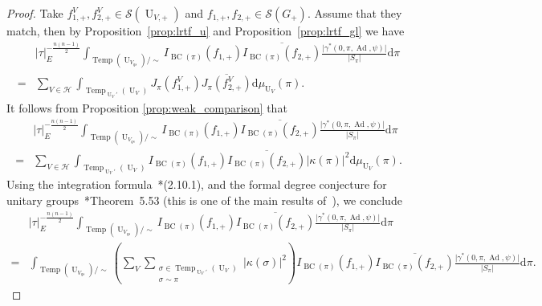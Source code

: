 \documentclass[letterpaper,11pt]{amsart}
\newcommand{\cH}{\mathcal{H}}
\newcommand{\cS}{\mathcal{S}}
\newcommand{\rd}{\mathrm{d}}
\newcommand{\<}{\negthickspace}
\providecommand{\abs}[1]{\lvert#1\rvert}
\DeclareMathOperator{\U}{U}
\DeclareMathOperator{\BC}{BC}
\DeclareMathOperator{\Ad}{Ad}
\DeclareMathOperator{\Temp}{Temp} \DeclareMathOperator{\temp}{temp}
\theoremstyle{definition}
\theoremstyle{plain}
\theoremstyle{remark}
\numberwithin{equation}{section}
\begin{document}
\begin{proof}
Take $f^V_{1, +}, f^V_{2, +} \in \cS(\U_{V, +})$ and $f_{1, +}, f_{2, +} \in
\cS(G_+)$. Assume that they match, then by Proposition~\ref{prop:lrtf_u} and
Proposition~\ref{prop:lrtf_gl} we have
    \[
    \begin{aligned}
    &\abs{\tau}_E^{-\frac{n(n-1)}{2}}
    \int_{\Temp(\U_{V_{qs}})/\sim} I_{\BC(\pi)}(f_{1, +})
    \overline{I_{\BC(\pi)}(f_{2, +})}
    \frac{\abs{\gamma^*(0,\pi, \Ad, \psi)}}{\abs{S_{\pi}}} \rd \pi\\
     =
    & \sum_{V \in \cH} \int_{\Temp_{\U_V'}(\U_V)} J_{\pi}(f_{1, +}^V)
    \overline{J_{\pi}(f_{2, +}^V)}
    \rd \mu_{\U_V}(\pi).
    \end{aligned}
    \]
It follows from Proposition \ref{prop:weak_comparison}
that
    \[
    \begin{aligned}
    &\abs{\tau}_E^{-\frac{n(n-1)}{2}}
    \int_{\Temp(\U_{V_{qs}})/\sim} I_{\BC(\pi)}(f_{1, +}) \overline{I_{\BC(\pi)}(f_{2, +})}
    \frac{\abs{\gamma^*(0,\pi, \Ad, \psi)}}{\abs{S_{\pi}}} \rd \pi\\
     =
    & \sum_{V \in \cH} \int_{\Temp_{\U_V'}(\U_V)}
    I_{\BC(\pi)}(f_{1, +}) \overline{I_{\BC(\pi)}(f_{2, +})}
    \abs{\kappa(\pi)}^2
    \rd \mu_{\U_V}(\pi).
    \end{aligned}
    \]
Using the integration formula~\cite{BP1}*{(2.10.1)}, and the formal degree
conjecture for unitary groups~\cite{BP1}*{Theorem~5.53} (this is one of the
main results of~\cite{BP1}), we conclude
    \begin{equation}    \label{eq:lrtf_comparison}
    \begin{aligned}
    &\abs{\tau}_E^{-\frac{n(n-1)}{2}}
    \int_{\Temp(\U_{V_{qs}})/\sim} I_{\BC(\pi)}(f_{1, +})
    \overline{I_{\BC(\pi)}(f_{2, +})}
    \frac{\abs{\gamma^*(0,\pi, \Ad, \psi)}}{\abs{S_{\pi}}} \rd \pi\\
     =
    & \int_{\Temp(\U_{V_{qs}})/\sim} \left( \sum_V
    \sum_{\substack{\sigma \in \Temp_{\U_V'}(\U_V)\\
    \sigma \sim \pi}} \abs{\kappa(\sigma)}^2 \right)
    I_{\BC(\pi)}(f_{1, +}) \overline{I_{\BC(\pi)}(f_{2, +})}
    \frac{\abs{\gamma^*(0,\pi, \Ad, \psi)}}{\abs{S_{\pi}}} \rd \pi.
    \end{aligned}
    \end{equation}


\end{proof}
\end{document}

